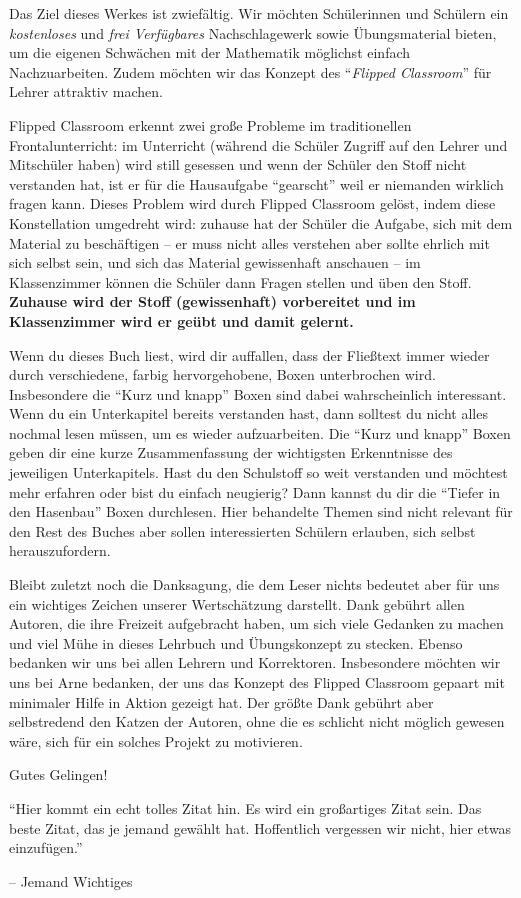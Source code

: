 \documentclass[../main.tex]{subfiles}
\begin{document}
Das Ziel dieses Werkes ist zwiefältig. Wir möchten Schülerinnen und Schülern ein \emph{kostenloses} und \emph{frei Verfügbares} Nachschlagewerk sowie Übungsmaterial bieten, um die eigenen Schwächen mit der Mathematik möglichst einfach Nachzuarbeiten. Zudem möchten wir das Konzept des \enquote{\emph{Flipped Classroom}} für Lehrer attraktiv machen.

Flipped Classroom erkennt zwei große Probleme im traditionellen Frontalunterricht: im Unterricht (während die Schüler Zugriff auf den Lehrer und Mitschüler haben) wird still gesessen und wenn der Schüler den Stoff nicht verstanden hat, ist er für die Hausaufgabe \enquote{gearscht} weil er niemanden wirklich fragen kann.
Dieses Problem wird durch Flipped Classroom gelöst, indem diese Konstellation umgedreht wird: zuhause hat der Schüler die Aufgabe, sich mit dem Material zu beschäftigen -- er muss nicht alles verstehen aber sollte ehrlich mit sich selbst sein, und sich das Material gewissenhaft anschauen -- im Klassenzimmer können die Schüler dann Fragen stellen und üben den Stoff. \textbf{Zuhause wird der Stoff (gewissenhaft) vorbereitet und im Klassenzimmer wird er geübt und damit gelernt.}

Wenn du dieses Buch liest, wird dir auffallen, dass der Fließtext immer wieder durch verschiedene, farbig hervorgehobene, Boxen unterbrochen wird. Insbesondere die \enquote{Kurz und knapp} Boxen sind dabei wahrscheinlich interessant. Wenn du ein Unterkapitel bereits verstanden hast, dann solltest du nicht alles nochmal lesen müssen, um es wieder aufzuarbeiten. Die \enquote{Kurz und knapp} Boxen geben dir eine kurze Zusammenfassung der wichtigsten Erkenntnisse des jeweiligen Unterkapitels. Hast du den Schulstoff so weit verstanden und möchtest mehr erfahren oder bist du einfach neugierig? Dann kannst du dir die \enquote{Tiefer in den Hasenbau} Boxen durchlesen. Hier behandelte Themen sind nicht relevant für den Rest des Buches aber sollen interessierten Schülern erlauben, sich selbst herauszufordern.

Bleibt zuletzt noch die Danksagung, die dem Leser nichts bedeutet aber für uns ein wichtiges Zeichen unserer Wertschätzung darstellt.
Dank gebührt allen Autoren, die ihre Freizeit aufgebracht haben, um sich viele Gedanken zu machen und viel Mühe in dieses Lehrbuch und Übungskonzept zu stecken. Ebenso bedanken wir uns bei allen Lehrern und Korrektoren. Insbesondere möchten wir uns bei Arne bedanken, der uns das Konzept des Flipped Classroom gepaart mit minimaler Hilfe in Aktion gezeigt hat. Der größte Dank gebührt aber selbstredend den Katzen der Autoren, ohne die es schlicht nicht möglich gewesen wäre, sich für ein solches Projekt zu motivieren.

{\hfill \Large Gutes Gelingen!}

\bigskip
\epigraph{\enquote{Hier kommt ein echt tolles Zitat hin. Es wird ein großartiges Zitat sein. Das beste Zitat, das je jemand gewählt hat. Hoffentlich vergessen wir nicht, hier etwas einzufügen.}}{-- Jemand Wichtiges}
\fi
\end{document}
